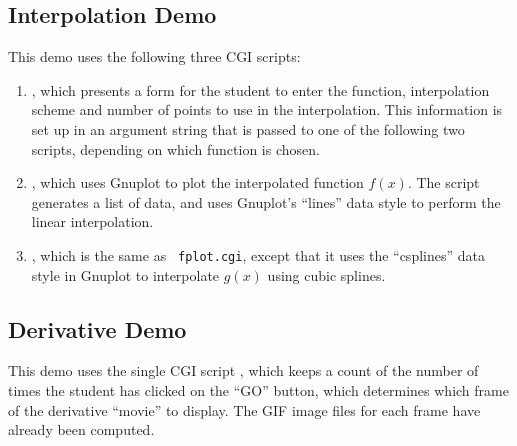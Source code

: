 \subsection{Interpolation Demo}
\label{lab1:tech:discrete}

This demo uses the following three CGI scripts:
\begin{enumerate}
\item {}, which presents a
form for the student to enter the function, interpolation scheme and
number of points to use in the interpolation.  This information is set
up in an argument string that is passed to one of the following two
scripts, depending on which function is chosen.
\item {}, which uses Gnuplot to plot
the interpolated function $f(x)$.  The script generates a list of data, and
uses Gnuplot's ``lines'' data style to perform the linear
interpolation. 
\item {}, which is the same as {\tt
  fplot.cgi}, except that it uses the ``csplines'' data style in Gnuplot
to interpolate $g(x)$ using cubic splines.
\end{enumerate}

\subsection{Derivative Demo}
\label{lab1:tech:deriv}

This demo uses the single CGI script 
, which keeps a 
count of the number of times the student has clicked on the ``GO'' 
button, which determines which frame of the derivative ``movie'' to
display.  
The GIF image files for each frame have already been computed.

